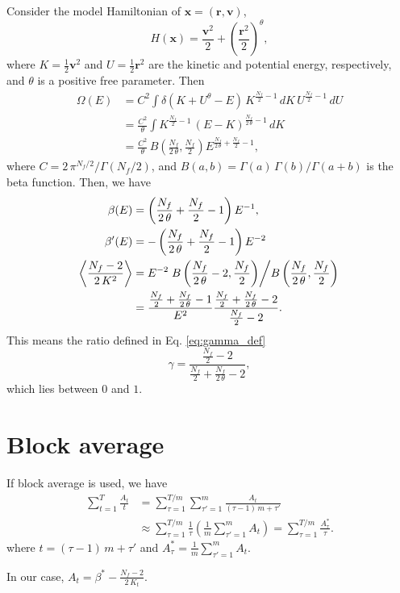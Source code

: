 \documentclass[reprint]{revtex4-1}
\begin{document}
Consider the model Hamiltonian of $\mathbf x = (\mathbf r, \mathbf v)$,
\begin{equation}
  H(\mathbf x)
  =
  \frac{\mathbf v^2} { 2 }
  +
  \left( \frac{\mathbf r^2} { 2 } \right)^\theta
  ,
\end{equation}
%
where $K = \frac 1 2 {\mathbf v}^2$ and
$U = \frac 1 2 {\mathbf r}^2$
are the kinetic and potential energy, respectively,
and $\theta$ is a positive free parameter.
Then
\begin{align*}
  \Omega(E)
  &=
  C^2
  \int
    \delta\left( K + U^\theta - E \right) \,
    K^{\frac{ N_f } 2 - 1} \, dK \, U^{\frac{ N_f } 2 - 1} \, dU
  \\
  &=
  \frac{ C^2 } { \theta }
  \int
  K^{\frac{ N_f } 2 - 1} \, (E - K)^{\frac{ N_f }{ 2 \, \theta } - 1}
    \, dK
  \\
  &=
  \frac{ C^2 }{ \theta } \,
  B\left( \frac{ N_f } {2 \, \theta}, \frac{ N_f } 2 \right)
  E^{ \frac{ N_f }{2 \, \theta} + \frac{N_f}{2} - 1 }
  ,
\end{align*}
where
%
$C = 2 \, \pi^{N_f/2} / \Gamma\left( N_f / 2 \right)$,
and
$B(a, b) = \Gamma(a) \, \Gamma(b) / \Gamma(a+b)$
is the beta function.
%
Then, we have
\begin{align*}
\beta(E)
&=
\left(
  \frac{ N_f } { 2 \, \theta } + \frac{ N_f } 2 - 1
\right)
E^{-1}
,
\\
\beta'(E)
&=
-
\left(
  \frac{ N_f } { 2 \, \theta } + \frac{ N_f } 2 - 1
\right)
E^{-2}
\\
\left\langle
  \frac{
    N_f - 2
  }
  {
    2 \, K^2
  }
\right\rangle
&=
  E^{-2}
\left.
  B\left( \frac{ N_f } { 2  \, \theta } - 2, \frac{ N_f } { 2 } \right)
\middle/
  B\left( \frac{ N_f } { 2  \, \theta }, \frac{ N_f } { 2 } \right)
\right.
\\
&=
\frac{ \frac{ N_f } 2 + \frac{ N_f }{2 \, \theta} - 1 }
     { E^2 }
\frac{ \frac{ N_f } 2 + \frac{ N_f }{2 \, \theta} - 2 }
     { \frac{ N_f } 2 - 2 }
.
\end{align*}
This means the ratio defined in Eq. \eqref{eq:gamma_def}
$$
\gamma
=
\frac
{
  \frac{ N_f } 2 - 2
}
{
  \frac{ N_f } 2 + \frac{N_f}{2 \, \theta} - 2
}
,
$$
which lies between $0$ and $1$.



\section{\label{sec:block}
Block average}



If block average is used, we have
%
\begin{align*}
  \sum_{t = 1}^T \frac{ A_t } { t }
  &=
  \sum_{\tau = 1}^{T/m}
  \sum_{\tau' = 1}^{m}
  \frac{ A_t } { (\tau - 1) \, m + \tau' }
  \\
  &\approx 
  \sum_{\tau = 1}^{T/m}
  \frac{ 1 } { \tau }
  \left(
    \frac 1 m
    \sum_{\tau' = 1}^m
    A_t
  \right)
  =
  \sum_{\tau = 1}^{T/m}
  \frac{ A^*_\tau } { \tau }
  .
\end{align*}
%
where
$t = (\tau - 1) \, m + \tau'$
and
$
A^*_\tau = \frac 1 m
\sum_{\tau' = 1}^m A_t.
$

In our case,
$
A_t = \beta^* - \frac{ N_f - 2 } { 2 \, K_t }.
$


%

\end{document}
